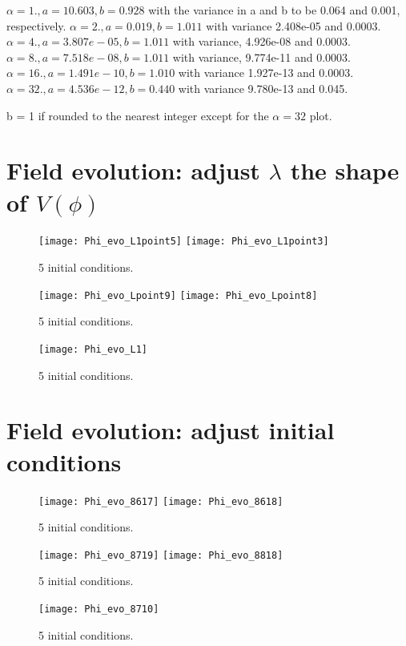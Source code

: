 \documentclass{article}
\begin{document}
$\alpha=1., a =  10.603, b =  0.928$ with the variance in a and b to be 0.064 and 0.001, respectively. $\alpha=2., a = 0.019, b =  1.011$ with variance 2.408e-05 and 0.0003. $\alpha=4., a = 3.807e-05, b =  1.011$ with variance, 4.926e-08 and 0.0003. $\alpha=8., a = 7.518e-08, b =  1.011$ with variance, 9.774e-11 and 0.0003. $\alpha=16., a = 1.491e-10, b =  1.010$ with variance 1.927e-13 and 0.0003. $\alpha=32., a = 4.536e-12, b =  0.440$ with variance 9.780e-13 and 0.045. 

\vspace{3mm}
b = 1 if rounded to the nearest integer except for the $\alpha=32$ plot. 



\section{Field evolution: adjust $\lambda$ the shape of $V(\phi)$}

\begin{figure}[H]
    \centering
    \texttt{[image: Phi\_evo\_L1point5]}
    \texttt{[image: Phi\_evo\_L1point3]}
    \caption{5 initial conditions.}
    \label{fig:Q1}
\end{figure}

\begin{figure}[H]
    \centering
    \texttt{[image: Phi\_evo\_Lpoint9]}
    \texttt{[image: Phi\_evo\_Lpoint8]}
    \caption{5 initial conditions.}
    \label{fig:Q1}
\end{figure}

\begin{figure}[H]
    \centering
    \texttt{[image: Phi\_evo\_L1]}
    \caption{5 initial conditions.}
    \label{fig:Q1}
\end{figure}

\section{Field evolution: adjust initial conditions}

\begin{figure}[H]
    \centering
    \texttt{[image: Phi\_evo\_8617]}
    \texttt{[image: Phi\_evo\_8618]}
    \caption{5 initial conditions.}
    \label{fig:Q1}
\end{figure}


\begin{figure}[H]
    \centering
    \texttt{[image: Phi\_evo\_8719]}
    \texttt{[image: Phi\_evo\_8818]}
    \caption{5 initial conditions.}
    \label{fig:Q1}
\end{figure}

\begin{figure}[H]
    \centering
    \texttt{[image: Phi\_evo\_8710]}
    \caption{5 initial conditions.}
    \label{fig:Q1}
\end{figure}
\end{document}
